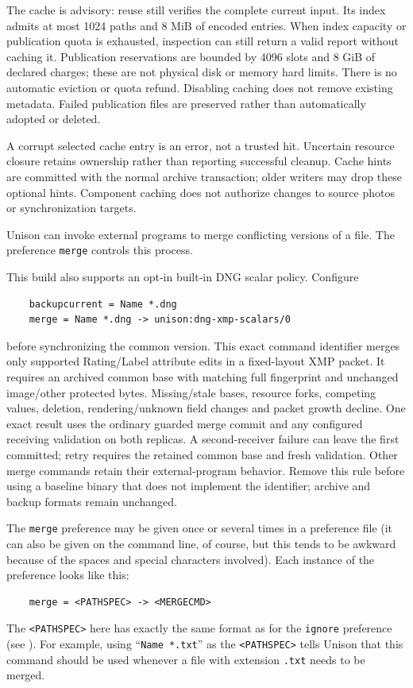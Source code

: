 \documentclass{article}
\begin{document}
The cache is advisory: reuse still verifies the complete current input. Its
index admits at most 1024 paths and 8 MiB of encoded entries. When index capacity
or publication quota is exhausted, inspection can still return a valid report
without caching it. Publication reservations are bounded by 4096 slots and
8 GiB of declared charges; these are not physical disk or memory hard limits.
There is no automatic eviction or quota refund. Disabling caching does not
remove existing metadata. Failed publication files are preserved rather than
automatically adopted or deleted.

A corrupt selected cache entry is an error, not a trusted hit. Uncertain
resource closure retains ownership rather than reporting successful cleanup.
Cache hints are committed with the normal archive transaction; older writers
may drop these optional hints. Component caching does not authorize changes to
source photos or synchronization targets.



Unison can invoke external programs to merge conflicting versions of a file.
The preference \verb|merge| controls this process.

This build also supports an opt-in built-in DNG scalar policy. Configure
\begin{verbatim}
    backupcurrent = Name *.dng
    merge = Name *.dng -> unison:dng-xmp-scalars/0
\end{verbatim}
before synchronizing the common version. This exact command identifier merges
only supported Rating/Label attribute edits in a fixed-layout XMP packet.
It requires an archived common base with matching full fingerprint and unchanged
image/other protected bytes. Missing/stale bases, resource forks, competing
values, deletion, rendering/unknown field changes and packet growth decline.
One exact result uses the ordinary guarded merge commit and any configured
receiving validation on both replicas. A second-receiver failure can leave the
first committed; retry requires the retained common base and fresh validation.
Other merge commands retain their external-program behavior. Remove this rule
before using a baseline binary that does not implement the identifier; archive
and backup formats remain unchanged.

The \verb|merge| preference may be given once or several times in a
preference file (it can also be given on the command line, of course, but
this tends to be awkward because of the spaces and special characters
involved).  Each instance of the preference looks like this:
\begin{verbatim}
    merge = <PATHSPEC> -> <MERGECMD>
\end{verbatim}
The \verb|<PATHSPEC>| here has exactly the same format as for the
\verb|ignore| preference (see ).  For example,
using ``\verb|Name *.txt|'' as the \verb|<PATHSPEC>| tells Unison that this
command should be used whenever a file with extension \verb|.txt| needs to
be merged.
\end{document}
